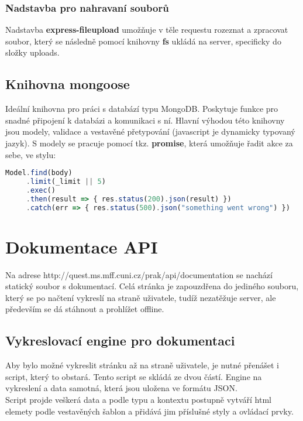 \subsubsection{Nadstavba pro nahravaní souborů}
Nadstavba \textbf{express-fileupload} umožňuje v těle requestu rozeznat a zpracovat soubor, který
se následně pomocí knihovny \textbf{fs} ukládá na server, specificky do složky uploads.

\subsection{Knihovna mongoose}
Ideální knihovna pro práci s databází typu MongoDB.
Poskytuje funkce pro snadné připojení k databázi a komunikaci s ní.
Hlavní výhodou této knihovny jsou modely, validace a vestavěné přetypování
(javascript je dynamicky typovaný jazyk). 
S modely se pracuje pomocí tkz. \textbf{promise}, která umožňuje řadit
akce za sebe, ve stylu:
\begin{lstlisting}[language=JavaScript]
Model.find(body)
     .limit(_limit || 5)
     .exec()
     .then(result => { res.status(200).json(result) })
     .catch(err => { res.status(500).json("something went wrong") })
\end{lstlisting}

\section{Dokumentace API}
Na adrese http://quest.ms.mff.cuni.cz/prak/api/documentation se nachází statický soubor s dokumentací.
Celá stránka je zapouzdřena do jediného souboru, který se po načtení 
vykreslí na straně uživatele, tudíž nezatěžuje server, ale
především se dá stáhnout a prohlížet offline.

\subsection{Vykreslovací engine pro dokumentaci}
Aby bylo možné vykreslit stránku až na straně uživatele,
je nutné přenášet i script, který to obstará. Tento script se skládá ze dvou částí.
Engine na vykreslení a data samotná, která jsou uložena ve formátu JSON.\\
Script projde veškerá data a podle typu a kontextu postupně vytváří
html elemety podle vestavěných šablon a přidává jim příslušné styly a ovládací prvky.


